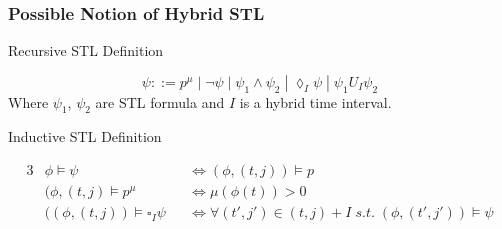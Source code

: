\documentclass{article}
\theoremstyle{definition}
\begin{document}

\clearpage


\subsubsection{Possible Notion of Hybrid STL}
\begin{center}
    Recursive STL Definition
\end{center}
\begin{equation}
    \psi ::= p^\mu\;|\;\lnot \psi\;|\;\psi_1 \land \psi_2\;|\;\lozenge_{I} \psi\;|\;\psi_1 U_{I} \psi_2
\end{equation}
Where $\psi_1$, $\psi_2$ are STL formula and $I$ is a hybrid time interval.

\begin{center}
    Inductive STL Definition
\end{center}
\begin{alignat*}{3}
            &\phi \models \psi &&\Leftrightarrow (\phi, (t,j)) \models p \\
            &(\phi, (t,j) \models p^\mu \quad &&\Leftrightarrow \mu(\phi(t))
> 0\\
            &((\phi,(t,j)) \models \square_{I} \psi &&\Leftrightarrow \forall (t',j') \in (t,j)+I\;s.t.\;(\phi, (t',j')) \models \psi
\end{alignat*}

\end{document}
